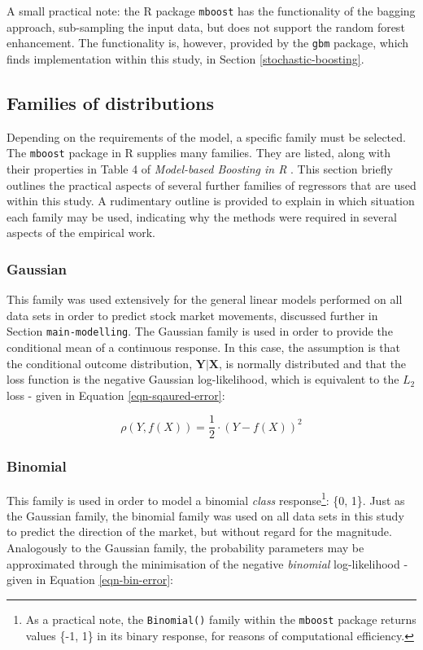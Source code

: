 \documentclass{article}
\begin{document}
A small practical note: the R package \texttt{mboost} has the functionality of the bagging approach, sub-sampling the input data, but does not support the random forest enhancement. The functionality is, however, provided by the \texttt{gbm} package, which finds implementation within this study, in Section \ref{stochastic-boosting}.


\subsection{Families of distributions}
\label{sec-1-6}

Depending on the requirements of the model, a specific family must be selected. The \texttt{mboost} package in R supplies many families. They are listed, along with their properties in Table 4 of \emph{Model-based Boosting in R} \cite{Hofner2012}. This section briefly outlines the practical aspects of several further families of regressors that are used within this study. A rudimentary outline is provided to explain in which situation each family may be used, indicating why the methods were required in several aspects of the empirical work.


\subsubsection{Gaussian}
\label{sec-1-6-1}

This family was used extensively for the general linear models performed on all data sets in order to predict stock market movements, discussed further in Section \texttt{main-modelling}. The Gaussian family is used in order to provide the conditional mean of a continuous response. In this case, the assumption is that the conditional outcome distribution, $\mathbf{Y}|\mathbf{X}$, is normally distributed and that the loss function is the negative Gaussian log-likelihood, which is equivalent to the $L_2$ loss - given in Equation \eqref{eqn-sqaured-error}:

\begin{equation}
  \rho (Y, f(X)) = \frac{1}{2} \cdot (Y - f(X))^2
  \label{eqn-sqaured-error}
\end{equation}


\subsubsection{Binomial}
\label{sec-1-6-2}

This family is used in order to model a binomial \emph{class} response\footnote{As a practical note, the \texttt{Binomial()} family within the \texttt{mboost} package returns values \{-1, 1\} in its binary response, for reasons of computational efficiency.}: \{0, 1\}. Just as the Gaussian family, the binomial family was used on all data sets in this study to predict the direction of the market, but without regard for the magnitude. Analogously to the Gaussian family, the probability parameters may be approximated through the minimisation of the negative \emph{binomial} log-likelihood - given in Equation \eqref{eqn-bin-error}:
\end{document}
